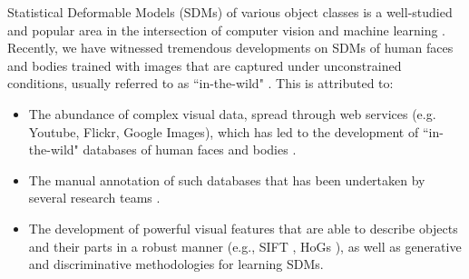 Statistical Deformable Models (SDMs) of various object classes is a well-studied and popular area in the intersection of computer vision and machine learning \cite{Cootes1995, Cootes2001, Matthews2004, Saragih2011, Belhumeur2011, Zhu2012, Xiong2013}. Recently, we have witnessed tremendous developments on SDMs of human faces and bodies trained with images that are captured under unconstrained conditions, usually referred to as ``in-the-wild" \cite{Belhumeur2011, Cao2012, Zhu2012, Xiong2013, Asthana2013, Tzimiropoulos2014, Asthana2014}. This is attributed to:
\begin{itemize}
\item The abundance of complex visual data, spread through web services (e.g. Youtube, Flickr, Google Images), which has led to the development of ``in-the-wild" databases of human faces and bodies \cite{Belhumeur2011, Le2012, Zhu2012, Burgos2013}.

\item The manual annotation of such databases that has been undertaken by several research teams \cite{sagonas_iccv_300w_2013,charles2013domain,dantone2014body,andriluka14cvpr}.

\item The development of powerful visual features that are able to describe objects and their parts in a robust manner (e.g., SIFT \cite{lowe1999object}, HoGs \cite{Dalal2005}
), as well as generative and discriminative methodologies for learning SDMs.
\end{itemize}


